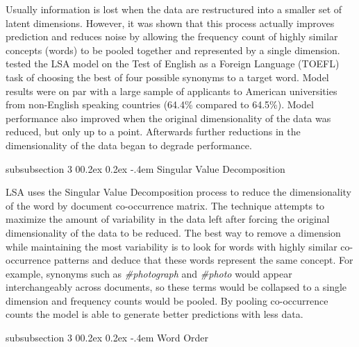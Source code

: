 \documentclass[man,floatsintext,donotrepeattitle]{apa6}
\makeatletter
\renewcommand{\subsubsection}{%
  \@startsection
  {subsubsection}%
  {3}%
  {\parindent}%
  {0\baselineskip \@plus 0.2ex \@minus 0.2ex}%
  {-.4em}%
  {\normalfont\normalsize\bfseries\addperi}}
\makeatother
\begin{document}
Usually information is lost when the data are restructured into a smaller set of latent dimensions.
However, it was shown that this process actually improves prediction and reduces noise by allowing the frequency count of highly similar concepts (words) to be pooled together and represented by a single dimension.
\textcite{Landauer1997} tested the LSA model on the Test of English as a Foreign Language (TOEFL) task of choosing the best of four possible synonyms to a target word.
Model results were on par with a large sample of applicants to American universities from non-English speaking countries (\num{64.4}\% compared to \num{64.5}\%).
Model performance also improved when the original dimensionality of the data was reduced, but only up to a point.
Afterwards further reductions in the dimensionality of the data began to degrade performance.

\subsubsection{Singular Value Decomposition}

LSA uses the Singular Value Decomposition process to reduce the dimensionality of the word by document co-occurrence matrix.
The technique attempts to maximize the amount of variability in the data left after forcing the original dimensionality of the data to be reduced.
The best way to remove a dimension while maintaining the most variability is to look for words with highly similar co-occurrence patterns and deduce that these words represent the same concept.
For example, synonyms such as \emph{\#photograph} and \emph{\#photo} would appear interchangeably across documents, so these terms would be collapsed to a single dimension and frequency counts would be pooled.
By pooling co-occurrence counts the model is able to generate better predictions with less data.

\subsubsection{Word Order}
\end{document}
